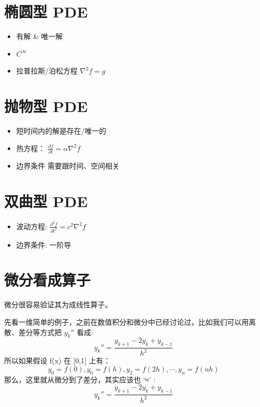 \documentclass[
]{book}
\providecommand{\tightlist}{%
  \setlength{\itemsep}{0pt}\setlength{\parskip}{0pt}}
\begin{document}
\hypertarget{ux692dux5706ux578b-pde}{%
\section{椭圆型 PDE}\label{ux692dux5706ux578b-pde}}

\begin{itemize}
\tightlist
\item
  有解 \& 唯一解
\item
  \(C^{\infty}\)
\item
  拉普拉斯/泊松方程 \(\nabla^2 f = g\)
\end{itemize}

\hypertarget{ux629bux7269ux578b-pde}{%
\section{抛物型 PDE}\label{ux629bux7269ux578b-pde}}

\begin{itemize}
\tightlist
\item
  短时间内的解是存在/唯一的
\item
  热方程： \(\frac{\partial f}{\partial t} = \alpha \nabla^2 f\)
\item
  边界条件 需要跟时间、空间相关
\end{itemize}

\hypertarget{ux53ccux66f2ux578b-pde}{%
\section{双曲型 PDE}\label{ux53ccux66f2ux578b-pde}}

\begin{itemize}
\tightlist
\item
  波动方程: \(\frac{\partial^2 f}{\partial t^2} = c^2 \nabla^2 f\)
\item
  边界条件: 一阶导
\end{itemize}

\hypertarget{ux5faeux5206ux770bux6210ux7b97ux5b50}{%
\section{微分看成算子}\label{ux5faeux5206ux770bux6210ux7b97ux5b50}}

微分很容易验证其为成线性算子。

先看一维简单的例子，之前在数值积分和微分中已经讨论过，比如我们可以用离散、差分等方式把 \(y_k''\) 看成:
\[
y_k'' = \frac{y_{k+1} - 2 y_k + y_{k-1}}{h^2}
\]
所以如果假设 f(x) 在 {[}0,1{]} 上有：
\[
y_0 = f(0), y_0 = f(h), y_2 = f(2h), \cdots ,y_n = f(nh) 
\]
那么，这里就从微分到了差分，其实应该也 `≈' :
\[
y_k'' = \frac{y_{k+1} - 2 y_k + y_{k-1}}{h^2}
\]
\end{document}
